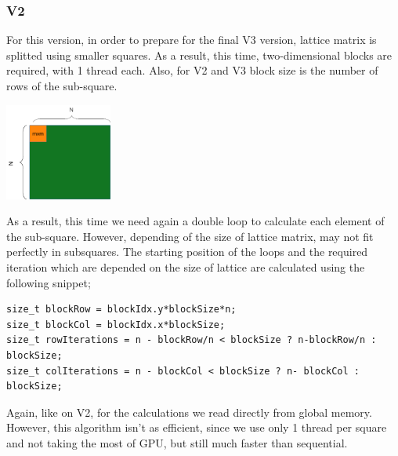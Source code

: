 \documentclass[11pt]{article}
\begin{document}
\subsubsection{V2}
\label{sec:orgac6d530}
For this version, in order to prepare for the final V3 version, lattice matrix is splitted using smaller squares. As a result, this time, two-dimensional blocks are required, with 1 thread each. Also, for V2 and V3 block size is the number of rows of the sub-square.
\begin{center}
\includegraphics[height=120]{./images/cuda-square-split.png}
\end{center}
As a result, this time we need again a double loop to calculate each element of the sub-square. However, depending of the size of lattice matrix, may not fit perfectly in subsquares. The starting position of the loops and the required iteration which are depended on the size of lattice are calculated using the following snippet;
\begin{verbatim}
size_t blockRow = blockIdx.y*blockSize*n;
size_t blockCol = blockIdx.x*blockSize;
size_t rowIterations = n - blockRow/n < blockSize ? n-blockRow/n : blockSize;
size_t colIterations = n - blockCol < blockSize ? n- blockCol : blockSize;
\end{verbatim}
Again, like on V2, for the calculations we read directly from global memory. However, this algorithm isn't as efficient, since we use only 1 thread per square and not taking the most of GPU, but still much faster than sequential.
\end{document}
